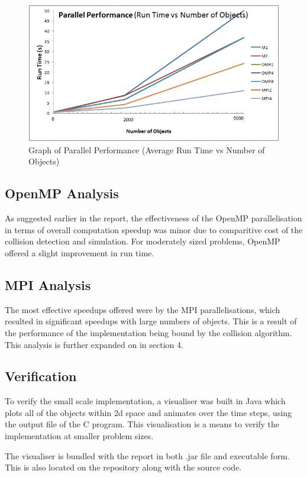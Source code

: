 \documentclass[twoside,twocolumn]{article}
\begin{document}
		\begin{figure}
			\caption{Graph of Parallel Performance (Average Run Time vs Number of Objects)}
			\includegraphics[scale=.9]{para.png}
		\end{figure}
	\subsection{OpenMP Analysis}
	As suggested earlier in the report, the effectiveness of the OpenMP parallelisation in terms of overall computation speedup was minor due to comparitive cost of the collision detection and simulation. For moderately sized problems, OpenMP offered a slight improvement in run time.
	
	\subsection{MPI Analysis}
	The most effective speedups offered were by the MPI parallelisations, which resulted in significant speedups with large numbers of objects. This is a result of the performance of the implementation being bound by the collision algorithm. This analysis is further expanded on in section 4.
	
	\subsection{Verification}
	
	To verify the small scale implementation, a visualiser was built in Java which plots all of the objects within 2d space and animates over the time steps, using the output file of the C program. This visualisation is a means to verify the implementation at smaller problem sizes. \newline
	
	The visualiser is bundled with the report in both .jar file and executable form. This is also located on the repository along with the source code. \newline
	
\end{document}
